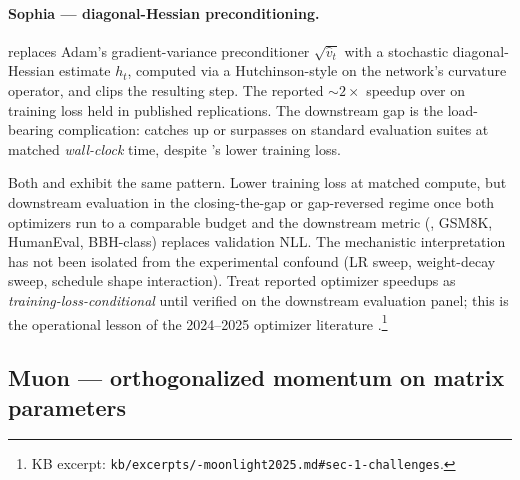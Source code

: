 \paragraph{Sophia --- diagonal-Hessian preconditioning.}
 \citep[Liu, Li et al.\ 2023, ICLR
2024]{muon-moonlight2025} replaces Adam's gradient-variance preconditioner
$\sqrt{\hat{v}_t}$ with a stochastic diagonal-Hessian estimate
$h_t$, computed via a Hutchinson-style  on the network's curvature
operator, and clips the resulting step. The reported $\sim\!2\times$
speedup over  on training loss held in published replications.
The downstream gap is the load-bearing complication:  catches up
or surpasses  on standard evaluation suites at matched
\emph{wall-clock} time, despite 's lower training loss.

\begin{contradiction}
\label{contra:opt-loss-vs-downstream}
Both  and  exhibit the same pattern. Lower training loss at
matched compute, but downstream evaluation in the closing-the-gap or
gap-reversed regime once both optimizers run to a comparable budget
and the downstream metric (, GSM8K, HumanEval, BBH-class)
replaces validation NLL. The mechanistic interpretation has not been
isolated from the experimental confound (LR sweep, weight-decay
sweep, schedule shape interaction). Treat reported optimizer
speedups as \emph{training-loss-conditional} until verified on the
downstream evaluation panel; this is the operational lesson of the
2024--2025  optimizer literature
\citep[\S 1]{muon-moonlight2025}.\protect\footnote{KB excerpt:
\texttt{kb/excerpts/-moonlight2025.md\#sec-1-challenges}.}
\end{contradiction}

\subsection{Muon --- orthogonalized momentum on matrix parameters}
\label{sec:opt-muon}

